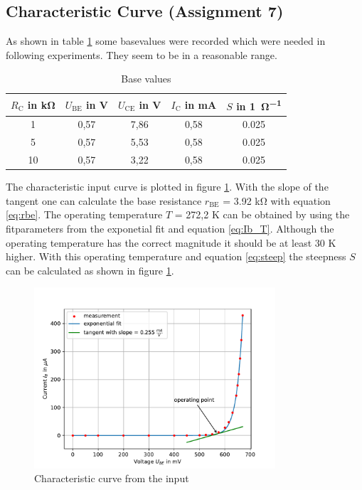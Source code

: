 \documentclass[11pt, a4paper]{article}
\begin{document}
\subsection{Characteristic Curve (Assignment 7)}
As shown in table \ref{tab:operating point_measurement} some basevalues were recorded which were needed in following experiments. They seem to be in a reasonable range.

\begin{table}[H]
    \centering
    \begin{tabular}{c|c|c|c|c}
    
        $R_{\text{C}}$ in \si{\kilo\ohm}  & $U_{\text{BE}}$ in \si{\volt} & $U_{\text{CE}}$ in \si{\volt} & $I_{\text{C}}$ in \si{\milli\ampere} & $S$ in \si{1\per\ohm} \\ \hline
        1 & 0,57 & 7,86 & 0,58 & 0.025\\ 
        5 & 0,57 & 5,53 & 0,58 & 0.025\\ 
        10 & 0,57 & 3,22 & 0,58 & 0.025\\ 
    \end{tabular}
    \label{tab:operating point_measurement}
    \caption{Base values}
\end{table}

The characteristic input curve is plotted in figure \ref{fig:Eincur}. With the slope of the tangent one can calculate the base resistance $r_{\text{BE}}$ = 3.92 \si{\kilo\ohm} with equation \ref{eq:rbe}. 
The operating temperature $T$ = 272,2 \si{\kelvin} can be obtained by using the fitparameters from the exponetial fit and equation \ref{eq:Ib_T}. Although the operating temperature has the correct magnitude it should be at least 30 \si{\kelvin} higher.
With this operating temperature and equation \ref{eq:steep} the steepness $S$ can be calculated as shown in figure \ref{tab:operating point_measurement}.

\begin{figure}[h]
    \centering
    \includegraphics[width=0.8\textwidth]{plots/Eingangskennlinie.pdf}
    \caption{Characteristic curve from the input}
    \label{fig:Eincur}
\end{figure}
\end{document}
